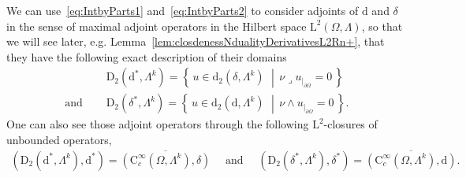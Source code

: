 \documentclass[AHL,Unicode,longabstracts,published]{cedram}
\newcommand{\rmd}{\mathrm{d}}
\newcommand{\rmD}{\mathrm{D}}
\newcommand{\rmL}{\mathrm{L}}
\newcommand{\rmC}{\mathrm{C}}
\begin{document}
We can use~\eqref{eq:IntbyParts1} and~\eqref{eq:IntbyParts2} to consider adjoints of $\rmd$ and ${\delta}$ in the sense of maximal adjoint operators in the Hilbert space $\rmL^2(\Omega,\Lambda)$, so that we will see later, e.g. Lemma~\ref{lem:closdenessNdualityDerivativesL2Rn+}, that they have the following exact description of their domains
\begin{align*}
&\rmD_{2}\left(\rmd^\ast,\Lambda^k\right) = \left\{\, u\in \rmd_{2}\left({\delta},\Lambda^k\right)\, \,\middle|\, \nu\lrcorner u_{|_{\partial\Omega}} =0\, \right\} \\
\text{ and }\quad &\rmD_{2}\left({\delta}^\ast,\Lambda^k\right) = \left\{\, u\in \rmd_{2}\left(\rmd,\Lambda^k\right)\, \,\middle|\, \nu\wedge u_{|_{\partial\Omega}} =0\, \right\}.
\end{align*}
One can also see those adjoint operators through the following $\rmL^2$-closures of unbounded operators,
\begin{align*}
\left(\rmD_{2}\left(\rmd^\ast,\Lambda^k\right),\rmd^\ast\right) = \overline{\left(\rmC_c^\infty\left(\Omega,\Lambda^k\right),{\delta}\right)}\quad\text{ and }\quad \left(\rmD_{2}\left({\delta}^\ast,\Lambda^k\right),{\delta}^\ast\right) = \overline{\left(\rmC_c^\infty\left(\Omega,\Lambda^k\right),\rmd\right)} .
\end{align*}
\end{document}
